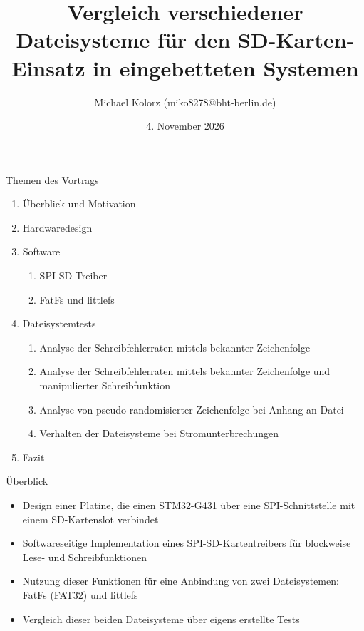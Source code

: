 \documentclass[
  ignorenonframetext,
]{beamer}
\title{Vergleich verschiedener Dateisysteme für den SD-Karten-Einsatz in
eingebetteten Systemen}
\author{Michael Kolorz (miko8278@bht-berlin.de)}
\date{4. November 2026}
\institute{Erstprüfer: Prof.~Dr.~Peter Gober ~Zweitprüfer:
Prof.~Dr.~David Dietrich}
\providecommand{\tightlist}{%
  \setlength{\itemsep}{0pt}\setlength{\parskip}{0pt}}
\begin{document}
\frame{\titlepage}

\begin{frame}{Themen des Vortrags}
\label{themen-des-vortrags}
\begin{enumerate}
\tightlist
\item
  Überblick und Motivation
\item
  Hardwaredesign
\item
  Software

  \begin{enumerate}
  \tightlist
  \item
    SPI-SD-Treiber
  \item
    FatFs und littlefs
  \end{enumerate}
\item
  Dateisystemtests

  \begin{enumerate}
  \tightlist
  \item
    Analyse der Schreibfehlerraten mittels bekannter Zeichenfolge
  \item
    Analyse der Schreibfehlerraten mittels bekannter Zeichenfolge und
    manipulierter Schreibfunktion
  \item
    Analyse von pseudo-randomisierter Zeichenfolge bei Anhang an Datei
  \item
    Verhalten der Dateisysteme bei Stromunterbrechungen
  \end{enumerate}
\item
  Fazit \normalsize
\end{enumerate}
\end{frame}

\begin{frame}{Überblick}
\label{uxfcberblick}
\begin{itemize}
\tightlist
\item
  Design einer Platine, die einen STM32-G431 über eine SPI-Schnittstelle
  mit einem SD-Kartenslot verbindet
\item
  Softwareseitige Implementation eines SPI-SD-Kartentreibers für
  blockweise Lese- und Schreibfunktionen
\item
  Nutzung dieser Funktionen für eine Anbindung von zwei Dateisystemen:
  FatFs (FAT32) und littlefs
\item
  Vergleich dieser beiden Dateisysteme über eigens erstellte Tests
\end{itemize}
\end{frame}
\end{document}

